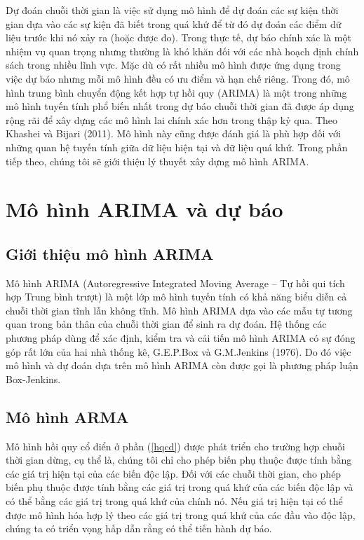 \documentclass[12pt, a4paper,oneside]{book}
\theoremstyle{definition}
\begin{document}
Dự đoán chuỗi thời gian là việc sử dụng mô hình để dự đoán các sự kiện thời gian dựa vào các sự kiện đã biết trong quá khứ để từ đó dự đoán các điểm dữ liệu trước khi nó xảy ra (hoặc được đo). Trong thực tế, dự báo chính xác là một nhiệm vụ quan trọng nhưng thường là khó khăn đối với các nhà hoạch định chính sách trong nhiều lĩnh vực. Mặc dù có rất nhiều mô hình được ứng dụng trong việc dự báo nhưng mỗi mô hình đều có ưu điểm và hạn chế riêng. Trong đó, mô hình trung bình chuyển động kết hợp tự hồi quy (ARIMA) là một trong những mô hình tuyến tính phổ biến nhất trong dự báo chuỗi thời gian đã được áp dụng rộng rãi để xây dựng các mô hình lai chính xác hơn trong thập kỷ qua. Theo Khashei và Bijari (2011). Mô hình này cũng được đánh giá là phù hợp đối với những quan hệ tuyến tính giữa dữ liệu hiện tại và dữ liệu quá khứ. Trong phần tiếp theo, chúng tôi sẽ giới thiệu lý thuyết xây dựng mô hình ARIMA.
\section{Mô hình ARIMA và dự báo}
\subsection{Giới thiệu mô hình ARIMA}

Mô hình ARIMA (Autoregressive Integrated Moving Average – Tự hồi qui tích hợp Trung bình trượt) là một lớp mô hình tuyến tính có khả năng biểu diễn cả chuỗi thời gian tĩnh lẫn không tĩnh. Mô hình ARIMA dựa vào các mẫu tự tương quan trong bản thân của chuỗi thời gian để sinh ra dự đoán. Hệ thống các phương pháp dùng để xác định, kiểm tra và cải tiến mô hình ARIMA có sự đóng góp rất lớn của hai nhà thống kê, G.E.P.Box và G.M.Jenkins (1976). Do đó việc mô hình và dự đoán dựa trên mô hình ARIMA còn được gọi là phương pháp luận Box-Jenkins. 
\subsection{Mô hình ARMA}
Mô hình hồi quy cổ điển ở phần (\ref{hqcd}) được phát triển cho trường hợp chuỗi thời gian dừng, cụ thể là, chúng tôi chỉ cho phép biến phụ thuộc được tính bằng các giá trị hiện tại của các biến độc lập. Đối với các chuỗi thời gian, cho phép biến phụ thuộc được tính bằng các giá trị trong quá khứ của các biến độc lập và có thể bằng các giá trị trong quá khứ của chính nó. Nếu giá trị hiện tại có thể được mô hình hóa hợp lý theo các giá trị trong quá khứ của các đầu vào độc lập, chúng ta có triển vọng hấp dẫn rằng có thể tiến hành dự báo.
\end{document}
